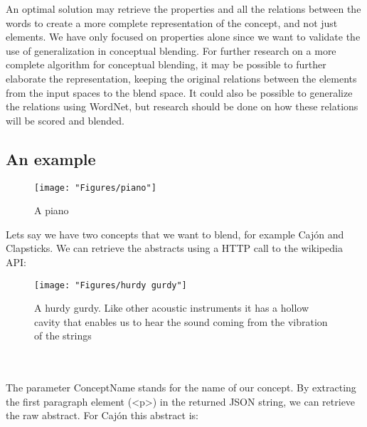 An optimal solution may retrieve the properties and all the relations between the words to create a more complete representation of the concept, and not just elements. We have only focused on properties alone since we want to validate the use of generalization in conceptual blending. For further research on a more complete algorithm for conceptual blending, it may be possible to further elaborate the representation, keeping the original relations between the elements from the input spaces to the blend space. It could also be possible to generalize the relations using WordNet, but research should be done on how these relations will be scored and blended.

\subsection{An example}
\begin{figure}[h]
	\centering
	\texttt{[image: "Figures/piano"]}
	\caption[Piano]{A piano}
	\label{fig:piano}
\end{figure}

Lets say we have two concepts that we want to blend, for example Cajón and Clapsticks.
We can retrieve the abstracts using a HTTP call to the wikipedia API:
\begin{figure}[h]
	\centering
	\texttt{[image: "Figures/hurdy gurdy"]}
	\caption[Hurdy gurdy]{A hurdy gurdy. Like other acoustic instruments it has a hollow cavity that enables us to hear the sound coming from the vibration of the strings}
	\label{fig:hurdy-gurdy}
\end{figure}


\noindent{}
\\\\The parameter ConceptName stands for the name of our concept. By extracting the first paragraph element (<p>) in the returned JSON string, we can retrieve the raw abstract. For Cajón this abstract is:
 
